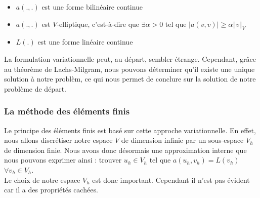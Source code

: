 \begin{itemize}
	\item $a(.,.)$ est une forme bilinéaire continue
	\item $a(.,.)$ est $V$-elliptique, c'est-à-dire que $\exists\alpha>0$ tel que $\left| a(v,v)\right| \ge \alpha\left\Vert v\right\Vert_{V}$
	\item $L(.)$ est une forme linéaire continue
\end{itemize}
La formulation variationnelle peut, au départ, sembler étrange. Cependant, grâce au théorème de Lachs-Milgram, nous pouvons déterminer qu'il existe une unique solution à notre problèm, ce qui nous permet de conclure sur la solution de notre problème de départ.\\

\subsubsection{La méthode des éléments finis}
Le principe des éléments finis est basé sur cette approche variationnelle. En effet, nous allons discrétiser notre espace $V$ de dimension infinie par un sous-espace $V_{h}$ de dimension finie. Nous avons donc désormais une approximation interne que nous pouvons exprimer ainsi : trouver $u_{h}\in V_{h}$ tel que $a(u_{h}, v_{h})=L\left(v_{h}\right)$ $\forall v_{h}\in V_h$. \\
Le choix de notre espace $V_{h}$ est donc important. Cependant il n'est pas évident car il a des propriétés cachées.\\

